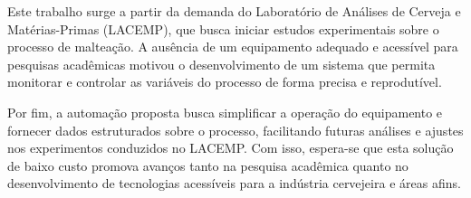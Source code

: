 Este trabalho surge a partir da demanda do Laboratório de Análises de Cerveja e Matérias-Primas (LACEMP), 
que busca iniciar estudos experimentais sobre o processo de malteação. A ausência de um equipamento adequado e acessível 
para pesquisas acadêmicas motivou o desenvolvimento de um sistema que permita monitorar e controlar as variáveis do 
processo de forma precisa e reprodutível. 

Por fim, a automação proposta busca simplificar a operação do equipamento e fornecer dados estruturados sobre o processo, 
facilitando futuras análises e ajustes nos experimentos conduzidos no LACEMP. 
Com isso, espera-se que esta solução de baixo custo promova avanços tanto na pesquisa acadêmica quanto no desenvolvimento 
de tecnologias acessíveis para a indústria cervejeira e áreas afins.
